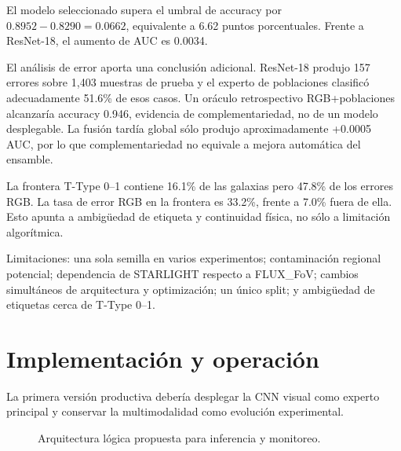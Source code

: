 \documentclass[letterpaper,11pt]{article}
\begin{document}
El modelo seleccionado supera el umbral de accuracy por $0.8952-0.8290=0.0662$, equivalente a 6.62 puntos porcentuales. Frente a ResNet-18, el aumento de AUC es 0.0034.

El análisis de error aporta una conclusión adicional. ResNet-18 produjo 157 errores sobre 1,403 muestras de prueba y el experto de poblaciones clasificó adecuadamente 51.6\% de esos casos. Un oráculo retrospectivo RGB+poblaciones alcanzaría accuracy 0.946, evidencia de complementariedad, no de un modelo desplegable. La fusión tardía global sólo produjo aproximadamente +0.0005 AUC, por lo que complementariedad no equivale a mejora automática del ensamble.

La frontera T-Type 0--1 contiene 16.1\% de las galaxias pero 47.8\% de los errores RGB. La tasa de error RGB en la frontera es 33.2\%, frente a 7.0\% fuera de ella. Esto apunta a ambigüedad de etiqueta y continuidad física, no sólo a limitación algorítmica.

Limitaciones: una sola semilla en varios experimentos; contaminación regional potencial; dependencia de STARLIGHT respecto a FLUX\_FoV; cambios simultáneos de arquitectura y optimización; un único split; y ambigüedad de etiquetas cerca de T-Type 0--1.

\section{Implementación y operación}
La primera versión productiva debería desplegar la CNN visual como experto principal y conservar la multimodalidad como evolución experimental.

\begin{figure}[H]\centering
{}
\caption{Arquitectura lógica propuesta para inferencia y monitoreo.}\label{fig:arquitectura}
\end{figure}
\end{document}
